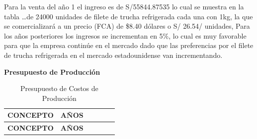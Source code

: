 \documentclass[
  stu,
  floatsintext,
  longtable,
  a4paper,
  nolmodern,
  notxfonts,
  notimes,
  12pt,
  colorlinks=true,linkcolor=blue,citecolor=blue,urlcolor=blue]{apa7}
\begin{document}
Para la venta del año 1 el ingreso es de S/55844.87535 lo cual se
muestra en la tabla \ldots de 24000 unidades de filete de trucha
refrigerada cada una con 1kg, la que se comercializará a un precio (FCA)
de \$8.40 dólares o S/ 26.54/ unidades, Para los años posteriores los
ingresos se incrementan en 5\%, lo cual es muy favorable para que la
empresa continúe en el mercado dado que las preferencias por el filete
de trucha refrigerada en el mercado estadounidense van incrementando.

\textbf{Presupuesto de Producción}

\begin{longtable}[]{@{}
  >{\raggedright\arraybackslash}p{}
  >{\centering\arraybackslash}p{}
  >{\centering\arraybackslash}p{}
  >{\centering\arraybackslash}p{}
  >{\centering\arraybackslash}p{}
  >{\centering\arraybackslash}p{}@{}}
\caption{Presupuesto de Costos de Producción}\tabularnewline
\toprule\noalign{}
\begin{minipage}[b]{\linewidth}\raggedright
\textbf{CONCEPTO}
\end{minipage} & \begin{minipage}[b]{\linewidth}\centering
\textbf{AÑOS}
\end{minipage} & \begin{minipage}[b]{\linewidth}\centering
\end{minipage} & \begin{minipage}[b]{\linewidth}\centering
\end{minipage} & \begin{minipage}[b]{\linewidth}\centering
\end{minipage} & \begin{minipage}[b]{\linewidth}\centering
\end{minipage} \\
\midrule\noalign{}
\endfirsthead
\toprule\noalign{}
\begin{minipage}[b]{\linewidth}\raggedright
\textbf{CONCEPTO}
\end{minipage} & \begin{minipage}[b]{\linewidth}\centering
\textbf{AÑOS}
\end{minipage} & \begin{minipage}[b]{\linewidth}\centering
\end{minipage} & \begin{minipage}[b]{\linewidth}\centering

\end{minipage}
\end{longtable}
\end{document}
